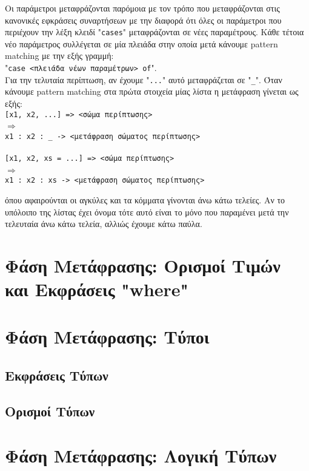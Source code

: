 \documentclass[diploma]{softlab-thesis}
\def\lra{$\Longrightarrow$\ }
\begin{document}
\begin{itemize}
Οι παράμετροι μεταφράζονται παρόμοια με τον τρόπο που μεταφράζονται στις
κανονικές εφκράσεις συναρτήσεων με την διαφορά ότι όλες οι παράμετροι που
περιέχουν την λέξη κλειδί "\texttt{cases}" μεταφράζονται σε νέες παραμέτρους.
Κάθε τέτοια νέο παράμετρος συλλέγεται σε μία πλειάδα στην οποία μετά κάνουμε
pattern matching με την εξής γραμμή:
\\"\verb|case <πλειάδα νέων παραμέτρων> of|". \\
Για την τελυταία περίπτωση, αν έχουμε "\verb|...|" αυτό μεταφράζεται σε
"\verb|_|". Όταν κάνουμε pattern matching στα πρώτα στοιχεία μίας λίστα η
μετάφραση γίνεται ως εξής:
\\
\verb|[x1, x2, ...] => <σώμα περίπτωσης>|
\\
\lra
\\
\verb|x1 : x2 : _ -> <μετάφραση σώματος περίπτωσης>|
\\\\
\verb|[x1, x2, xs = ...] => <σώμα περίπτωσης>|
\\
\lra
\\
\verb|x1 : x2 : xs -> <μετάφραση σώματος περίπτωσης>|

όπου αφαιρούνται οι αγκύλες και τα κόμματα γίνονται άνω κάτω τελείες.
Αν το υπόλοιπο της λίστας έχει όνομα τότε αυτό είναι το μόνο που παραμένει
μετά την τελευταία άνω κάτω τελεία, αλλιώς έχουμε κάτω παύλα.
\end{itemize}

\newpage

\section{Φάση Μετάφρασης: Ορισμοί Τιμών και Εκφράσεις "where"}

\section{Φάση Μετάφρασης: Τύποι}

\subsection{Εκφράσεις Τύπων}

\subsection{Ορισμοί Τύπων}

\section{Φάση Μετάφρασης: Λογική Τύπων}
\end{document}
